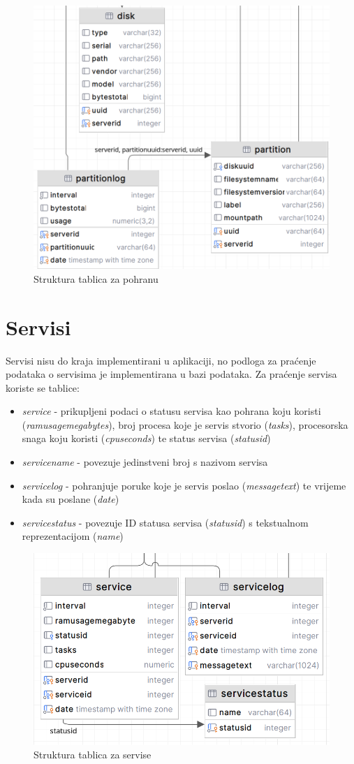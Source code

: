 \documentclass[zavrsnirad]{fer}
\begin{document}
\begin{figure}[htb!]
	\centering
	\includegraphics[width=0.6\linewidth]{images/db_storage.png} 
	\caption{Struktura tablica za pohranu}
\end{figure}
\FloatBarrier

\section{Servisi}
Servisi nisu do kraja implementirani u aplikaciji, no podloga za praćenje podataka o servisima je implementirana u bazi podataka. Za praćenje servisa koriste se tablice:
\begin{itemize}
	\item \textit{service} - prikupljeni podaci o statusu servisa kao pohrana koju koristi (\textit{ramusagemegabytes}), broj procesa koje je servis stvorio (\textit{tasks}), procesorska snaga koju koristi (\textit{cpuseconds}) te status servisa (\textit{statusid})
	\item \textit{servicename} - povezuje jedinstveni broj s nazivom servisa
	\item \textit{servicelog} - pohranjuje poruke koje je servis poslao (\textit{messagetext}) te vrijeme kada su poslane (\textit{date})
	\item \textit{servicestatus} - povezuje ID statusa servisa (\textit{statusid}) s tekstualnom reprezentacijom (\textit{name})
\end{itemize}

\begin{figure}[htb!]
	\centering
	\includegraphics[width=0.6\linewidth]{images/db_services.png} 
	\caption{Struktura tablica za servise}
\end{figure}
\FloatBarrier
\end{document}
